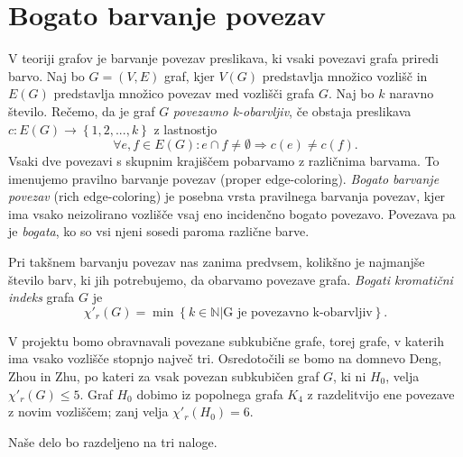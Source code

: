 \documentclass[12pt,a4paper]{article}
\begin{document}
\section{Bogato barvanje povezav}

V teoriji grafov je barvanje povezav preslikava, ki vsaki povezavi grafa priredi barvo. 
Naj bo $G = (V,E)$ graf, kjer $V(G)$ predstavlja množico vozlišč in $E(G)$ predstavlja množico povezav med vozlišči grafa $G$.
Naj bo $k$ naravno število. Rečemo, da je graf $G$ \textit{povezavno k-obarvljiv}, če obstaja preslikava $c:E(G) \rightarrow \left\{1,2,...,k\right\}$ z lastnostjo
\[\forall e, f \in E(G): e \cap f \neq \emptyset \Rightarrow c(e) \neq c(f).\] Vsaki dve povezavi s skupnim krajiščem pobarvamo z različnima barvama. To imenujemo pravilno barvanje povezav (proper edge-coloring).
\textit{Bogato barvanje povezav} (rich edge-coloring) je posebna vrsta pravilnega barvanja povezav, kjer
ima vsako neizolirano vozlišče vsaj eno incidenčno bogato povezavo. 
Povezava pa je \textit{bogata}, ko so vsi njeni sosedi paroma različne barve.

\vspace{\baselineskip}
Pri takšnem barvanju povezav nas zanima predvsem, kolikšno je najmanjše število barv, ki jih potrebujemo, da obarvamo povezave grafa.
\textit{Bogati kromatični indeks} grafa $G$ je \[\chi'_r(G) = \min \left\{k \in \mathbb{N} | \text{G je povezavno k-obarvljiv}\right\}.\]

V projektu bomo obravnavali povezane subkubične grafe, torej grafe, v katerih ima vsako vozlišče stopnjo največ tri. Osredotočili se bomo na domnevo Deng, Zhou in Zhu, po kateri za vsak povezan subkubičen graf $G$, ki ni
$H_0$, velja $\chi'_r(G) \leq 5$. Graf $H_0$ dobimo iz popolnega grafa $K_4$ z razdelitvijo ene povezave z novim vozliščem; zanj velja $\chi'_r(H_0)=6$.

\vspace{\baselineskip}
Naše delo bo razdeljeno na tri naloge.
\end{document}
